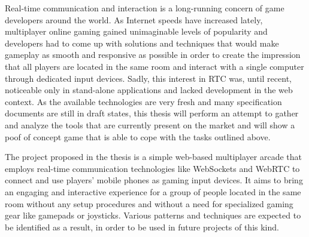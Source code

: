 Real-time communication and interaction is a long-running concern of game
developers around the world. As Internet speeds have increased lately,
multiplayer online gaming gained unimaginable levels of popularity and
developers had to come up with solutions and techniques that would make gameplay
as smooth and responsive as possible in order to create the impression that all
players are located in the same room and interact with a single computer through
dedicated input devices. Sadly, this interest in RTC was, until recent,
noticeable only in stand-alone applications and lacked development in the web
context. As the available technologies are very fresh and many specification
documents are still in draft states, this thesis will perform an attempt to
gather and analyze the tools that are currently present on the market and will
show a poof of concept game that is able to cope with the tasks outlined above.

The project proposed in the thesis is a simple web-based multiplayer arcade that
employs real-time communication technologies like WebSockets and WebRTC to
connect and use players' mobile phones as gaming input devices. It aims to bring
an engaging and interactive experience for a group of people located in the same
room without any setup procedures and without a need for specialized gaming gear
like gamepads or joysticks. Various patterns and techniques are expected to be
identified as a result, in order to be used in future projects of this kind.


\clearpage
